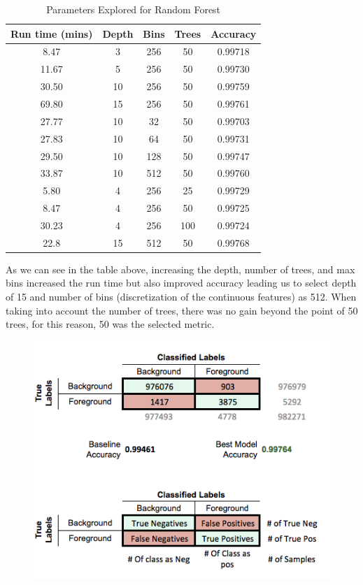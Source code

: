 \documentclass{neu_handout}
\begin{document}
\begin{table}[h!]
\centering
 \begin{tabular}{||c c c c c||} 
 \hline
Run time (mins) & Depth & Bins & Trees & Accuracy \\ [0.5ex] 
 \hline\hline
8.47  & 3  & 256 & 50 & 0.99718 \\
11.67 & 5  & 256 & 50 & 0.99730 \\
30.50 & 10 & 256 & 50 & 0.99759 \\
69.80 & 15 & 256 & 50 & 0.99761 \\
 \hline
27.77 & 10 & 32  & 50 & 0.99703 \\
27.83 & 10 & 64  & 50 & 0.99731 \\
29.50 & 10 & 128 & 50 & 0.99747 \\
33.87 & 10 & 512 & 50 & 0.99760 \\ 
 \hline 
5.80  & 4 & 256 & 25  & 0.99729 \\
8.47  & 4 & 256 & 50  & 0.99725 \\
30.23 & 4 & 256 & 100 & 0.99724 \\
\hline
\hline
22.8 	& 15  & 512 & 50 & 0.99768 \\[1ex] 
 \hline
 \end{tabular}
 \caption{Parameters Explored for Random Forest} \label{tab:parameters-runtime}
\end{table}

As we can see in the table above, increasing the depth, number of trees, and max bins increased the run time but also improved accuracy leading us to select depth of 15 and number of bins (discretization of the continuous features) as 512. When taking into account the number of trees, there was no gain beyond the point of 50 trees, for this reason, 50 was the selected metric.\\

\begin{center}
\begin{figure}[!h]
\centering
  \includegraphics[width=0.3\linewidth]{confusionmatrix}
  \label{fig:confusionmatrix}
\end{figure}
\end{center}
\end{document}
